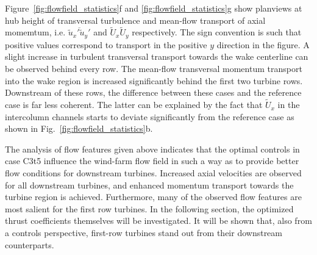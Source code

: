 \documentclass[wes, manuscript]{copernicus}
\begin{document}
Figure~\ref{fig:flowfield_statistics}f and \ref{fig:flowfield_statistics}g show planviews at hub height of transversal turbulence and mean-flow transport of axial momemtum, i.e. $\overline{\widetilde{u}_x' \widetilde{u}_y'}$ and $\widetilde{U}_x \widetilde{U}_y$ respectively. The sign convention is such that positive values correspond to transport in the positive $y$ direction in the figure. A slight increase in turbulent transversal transport towards the wake centerline can be observed behind every row. The mean-flow transversal momentum transport into the wake region is increased significantly behind the first two turbine rows. Downstream of these rows, the difference between these cases and the reference case is far less coherent. The latter can be explained by the fact that $\widetilde{U}_x$ in the intercolumn channels starts to deviate significantly from the reference case as shown in Fig.~\ref{fig:flowfield_statistics}b. 

The analysis of flow features given above indicates that the optimal controls in case C3t5 influence the wind-farm flow field in such a way as to provide better flow conditions for downstream turbines. Increased axial velocities are observed for all downstream turbines, and enhanced momentum transport towards the turbine region is achieved. Furthermore, many of the observed flow features are most salient for the first row turbines. In the following section, the optimized thrust coefficients themselves will be investigated. It will be shown that, also from a controls perspective, first-row turbines stand out from their downstream counterparts.
\end{document}
